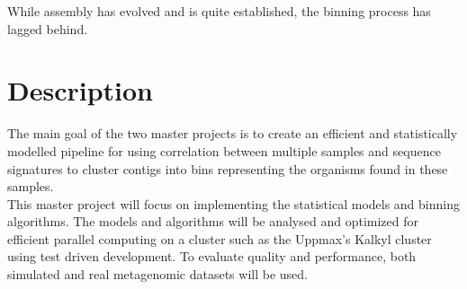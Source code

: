 \documentclass{article}
\begin{document}
While assembly has evolved and is quite established, the binning process has lagged behind.
\section*{Description}
The main goal of the two master projects is to create an efficient and statistically modelled pipeline for using correlation between multiple samples and sequence signatures to cluster contigs into bins representing the organisms found in these samples. \\

This master project will focus on implementing the statistical models and binning algorithms. The models and algorithms will be analysed and optimized for efficient parallel computing on a cluster such as the Uppmax's Kalkyl cluster using test driven development. To evaluate quality and performance, both simulated and real metagenomic datasets will be used.\\
\end{document}
